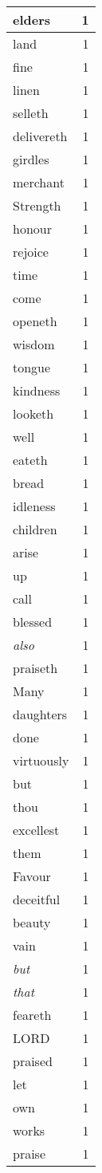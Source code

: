 \begin{center}
\begin{longtable}{l|r}
elders & 1\\ \hline 
land & 1\\ \hline 
fine & 1\\ \hline 
linen & 1\\ \hline 
selleth & 1\\ \hline 
delivereth & 1\\ \hline 
girdles & 1\\ \hline 
merchant & 1\\ \hline 
Strength & 1\\ \hline 
honour & 1\\ \hline 
rejoice & 1\\ \hline 
time & 1\\ \hline 
come & 1\\ \hline 
openeth & 1\\ \hline 
wisdom & 1\\ \hline 
tongue & 1\\ \hline 
kindness & 1\\ \hline 
looketh & 1\\ \hline 
well & 1\\ \hline 
eateth & 1\\ \hline 
bread & 1\\ \hline 
idleness & 1\\ \hline 
children & 1\\ \hline 
arise & 1\\ \hline 
up & 1\\ \hline 
call & 1\\ \hline 
blessed & 1\\ \hline 
\emph{also} & 1\\ \hline 
praiseth & 1\\ \hline 
Many & 1\\ \hline 
daughters & 1\\ \hline 
done & 1\\ \hline 
virtuously & 1\\ \hline 
but & 1\\ \hline 
thou & 1\\ \hline 
excellest & 1\\ \hline 
them & 1\\ \hline 
Favour & 1\\ \hline 
deceitful & 1\\ \hline 
beauty & 1\\ \hline 
vain & 1\\ \hline 
\emph{but} & 1\\ \hline 
\emph{that} & 1\\ \hline 
feareth & 1\\ \hline 
LORD & 1\\ \hline 
praised & 1\\ \hline 
let & 1\\ \hline 
own & 1\\ \hline 
works & 1\\ \hline 
praise & 1\\ \hline 
\end{longtable}  
\end{center}  


